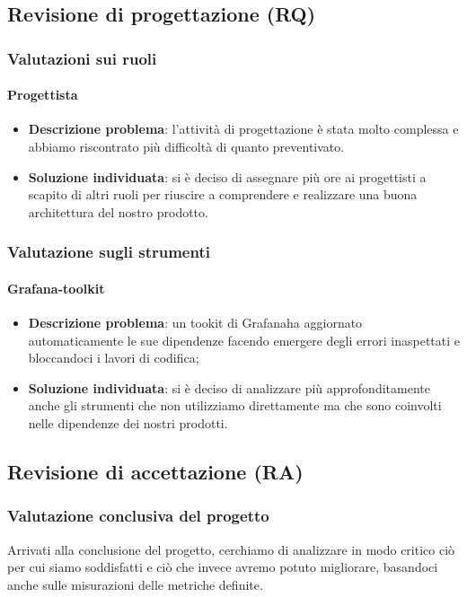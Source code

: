 		\subsection{Revisione di progettazione (RQ)}
		\subsubsection{Valutazioni sui ruoli}
			\paragraph{Progettista}
				\begin{itemize}
					\item \textbf{Descrizione problema}: l'attività di progettazione è stata molto complessa e abbiamo riscontrato più difficoltà di quanto preventivato.
					\item \textbf{Soluzione individuata}: si è deciso di assegnare più ore ai progettisti a scapito di altri ruoli per riuscire a comprendere e realizzare una buona architettura del nostro prodotto\glo.
				\end{itemize}
		\subsubsection{Valutazione sugli strumenti}
			\paragraph{Grafana-toolkit}
				\begin{itemize}
					\item \textbf{Descrizione problema}: un tookit di Grafana\glosp ha aggiornato automaticamente le sue dipendenze facendo emergere degli errori inaspettati e bloccandoci i lavori di codifica;
					\item \textbf{Soluzione individuata}: si è deciso di analizzare più approfonditamente anche gli strumenti che non utilizziamo direttamente ma che sono coinvolti nelle dipendenze dei nostri prodotti.
				\end{itemize}
		\subsection{Revisione di accettazione (RA)}
		\subsubsection{Valutazione conclusiva del progetto}
		Arrivati alla conclusione del progetto, cerchiamo di analizzare in modo critico ciò per cui siamo soddisfatti e ciò che invece avremo potuto migliorare, basandoci anche sulle misurazioni delle metriche definite.

